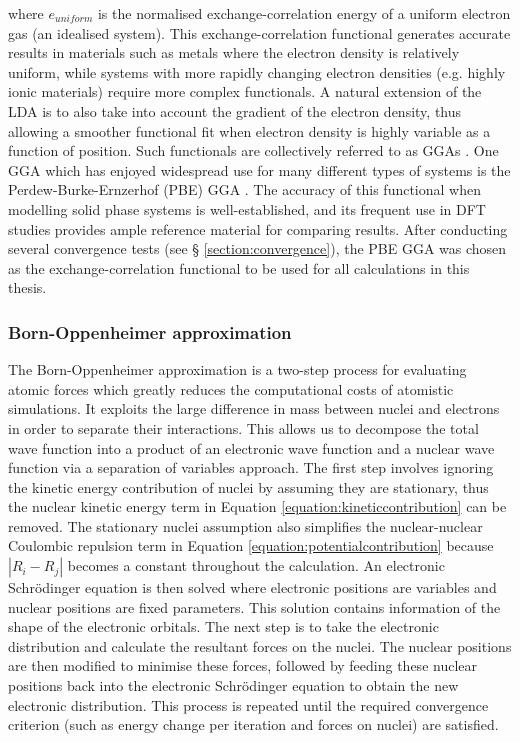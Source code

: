 where $e_{uniform}$ is the normalised exchange-correlation energy of a uniform electron gas (an idealised system). This exchange-correlation functional generates accurate results in materials such as metals where the electron density is relatively uniform, while systems with more rapidly changing electron densities (e.g. highly ionic materials) require more complex functionals. A natural extension of the LDA is to also take into account the gradient of the electron density, thus allowing a smoother functional fit when electron density is highly variable as a function of position. Such functionals are collectively referred to as GGAs \cite{Langreth1980, Langreth1983, Becke1988, perdew2008restoring}. One GGA which has enjoyed widespread use for many different types of systems is the Perdew-Burke-Ernzerhof (PBE) GGA \cite{Perdew1996}. The accuracy of this functional when modelling solid phase systems is well-established, and its frequent use in DFT studies provides ample reference material for comparing results. After conducting several convergence tests (see § \ref{section:convergence}), the PBE GGA was chosen as the exchange-correlation functional to be used for all calculations in this thesis.

\subsubsection{Born-Oppenheimer approximation}

The Born-Oppenheimer approximation is a two-step process for evaluating atomic forces which greatly reduces the computational costs of atomistic simulations. It exploits the large difference in mass between nuclei and electrons in order to separate their interactions. This allows us to decompose the total wave function into a product of an electronic wave function and a nuclear wave function via a separation of variables approach. The first step involves ignoring the kinetic energy contribution of nuclei by assuming they are stationary, thus the nuclear kinetic energy term in Equation \ref{equation:kineticcontribution} can be removed. The stationary nuclei assumption also simplifies the nuclear-nuclear Coulombic repulsion term in Equation \ref{equation:potentialcontribution} because $|R_i - R_j|$ becomes a constant throughout the calculation. An electronic Schr\"{o}dinger equation is then solved where electronic positions are variables and nuclear positions are fixed parameters. This solution contains information of the shape of the electronic orbitals. The next step is to take the electronic distribution and calculate the resultant forces on the nuclei. The nuclear positions are then modified to minimise these forces, followed by feeding these nuclear positions back into the electronic Schr\"{o}dinger equation to obtain the new electronic distribution. This process is repeated until the required convergence criterion (such as energy change per iteration and forces on nuclei) are satisfied.

